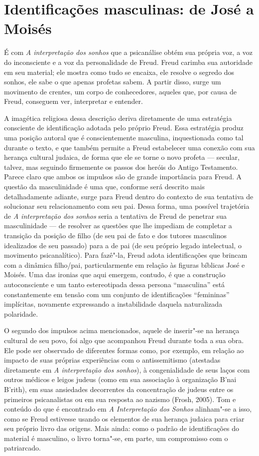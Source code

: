 \section{Identificações masculinas: de José a Moisés}

É com \emph{A interpretação dos sonhos} que a psicanálise obtém sua
própria voz, a voz do inconsciente e a voz da personalidade de Freud.
Freud carimba sua autoridade em seu material; ele mostra como tudo se
encaixa, ele resolve o segredo dos sonhos, ele sabe o que apenas
profetas sabem. A partir disso, surge um movimento de crentes, um corpo
de conhecedores, aqueles que, por causa de Freud, conseguem ver,
interpretar e entender.

A imagética religiosa dessa descrição deriva diretamente de uma
estratégia consciente de identificação adotada pelo próprio Freud. Essa
estratégia produz uma posição autoral que é conscientemente masculina,
inquestionada como tal durante o texto, e que também permite a Freud
estabelecer uma conexão com sua herança cultural judaica, de forma que
ele se torne o novo profeta --- secular, talvez, mas seguindo firmemente
os passos dos heróis do Antigo Testamento. Parece claro que ambos os
impulsos são de grande importância para Freud. A questão da
masculinidade é uma que, conforme será descrito mais detalhadamente
adiante, surge para Freud dentro do contexto de sua tentativa de
solucionar seu relacionamento com seu pai. Dessa forma, uma possível
trajetória de \emph{A interpretação dos sonhos} seria a tentativa de
Freud de penetrar sua masculinidade --- de resolver as questões que lhe
impediam de completar a transição da posição de filho (de seu pai de
fato e dos tutores masculinos idealizados de seu passado) para a de pai
(de seu próprio legado intelectual, o movimento psicanalítico). Para
fazê"-la, Freud adota identificações que brincam com a dinâmica
filho/pai, particularmente em relação às figuras bíblicas José e Moisés.
Uma das ironias que aqui emergem, contudo, é que a construção
autoconsciente e um tanto estereotipada dessa persona ``masculina'' está
constantemente em tensão com um conjunto de identificações ``femininas''
implícitas, novamente expressando a instabilidade daquela naturalizada
polaridade.

O segundo dos impulsos acima mencionados, aquele de inserir"-se na
herança cultural de seu povo, foi algo que acompanhou Freud durante toda
a sua obra. Ele pode ser observado de diferentes formas como, por
exemplo, em relação ao impacto de suas próprias experiências com o
antissemitismo (atestadas diretamente em \emph{A interpretação dos
sonhos}), à congenialidade de seus laços com outros médicos e leigos
judeus (como em sua associação à organização B'nai B'rith), em suas
ansiedades decorrentes da concentração de judeus entre os primeiros
psicanalistas ou em sua resposta ao nazismo (Frosh, 2005). Tom e
conteúdo do que é encontrado em \emph{A Interpretação dos Sonhos}
alinham"-se a isso, como se Freud estivesse usando os elementos de sua
herança judaica para criar seu próprio livro das origens. Mais ainda:
como o padrão de identificações do material é masculino, o livro
torna"-se, em parte, um compromisso com o patriarcado.

